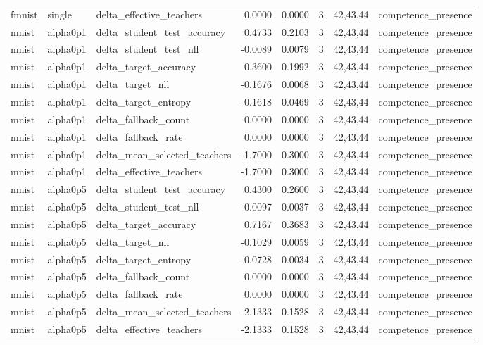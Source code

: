 \begin{tabular}{lllrrrll}
fmnist & single & delta\_effective\_teachers & 0.0000 & 0.0000 & 3 & 42,43,44 & competence\_presence \\
mnist & alpha0p1 & delta\_student\_test\_accuracy & 0.4733 & 0.2103 & 3 & 42,43,44 & competence\_presence \\
mnist & alpha0p1 & delta\_student\_test\_nll & -0.0089 & 0.0079 & 3 & 42,43,44 & competence\_presence \\
mnist & alpha0p1 & delta\_target\_accuracy & 0.3600 & 0.1992 & 3 & 42,43,44 & competence\_presence \\
mnist & alpha0p1 & delta\_target\_nll & -0.1676 & 0.0068 & 3 & 42,43,44 & competence\_presence \\
mnist & alpha0p1 & delta\_target\_entropy & -0.1618 & 0.0469 & 3 & 42,43,44 & competence\_presence \\
mnist & alpha0p1 & delta\_fallback\_count & 0.0000 & 0.0000 & 3 & 42,43,44 & competence\_presence \\
mnist & alpha0p1 & delta\_fallback\_rate & 0.0000 & 0.0000 & 3 & 42,43,44 & competence\_presence \\
mnist & alpha0p1 & delta\_mean\_selected\_teachers & -1.7000 & 0.3000 & 3 & 42,43,44 & competence\_presence \\
mnist & alpha0p1 & delta\_effective\_teachers & -1.7000 & 0.3000 & 3 & 42,43,44 & competence\_presence \\
mnist & alpha0p5 & delta\_student\_test\_accuracy & 0.4300 & 0.2600 & 3 & 42,43,44 & competence\_presence \\
mnist & alpha0p5 & delta\_student\_test\_nll & -0.0097 & 0.0037 & 3 & 42,43,44 & competence\_presence \\
mnist & alpha0p5 & delta\_target\_accuracy & 0.7167 & 0.3683 & 3 & 42,43,44 & competence\_presence \\
mnist & alpha0p5 & delta\_target\_nll & -0.1029 & 0.0059 & 3 & 42,43,44 & competence\_presence \\
mnist & alpha0p5 & delta\_target\_entropy & -0.0728 & 0.0034 & 3 & 42,43,44 & competence\_presence \\
mnist & alpha0p5 & delta\_fallback\_count & 0.0000 & 0.0000 & 3 & 42,43,44 & competence\_presence \\
mnist & alpha0p5 & delta\_fallback\_rate & 0.0000 & 0.0000 & 3 & 42,43,44 & competence\_presence \\
mnist & alpha0p5 & delta\_mean\_selected\_teachers & -2.1333 & 0.1528 & 3 & 42,43,44 & competence\_presence \\
mnist & alpha0p5 & delta\_effective\_teachers & -2.1333 & 0.1528 & 3 & 42,43,44 & competence\_presence \\

\end{tabular}
